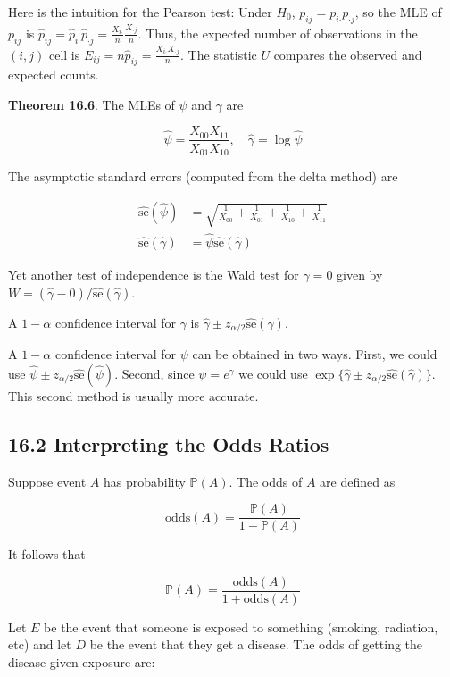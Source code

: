 Here is the intuition for the Pearson test: Under \(H_{0}\),
\(p_{ij} = p_{i\text{·}} p_{\text{·}j}\), so the MLE of \(p_{ij}\) is
\(\hat{p}_{ij} = \hat{p}_{i\text{·}} \hat{p}_{\text{·}j} = \frac{X_{i\text{·}}}{n} \frac{X_{\text{·}j}}{n}\).
Thus, the expected number of observations in the \((i, j)\) cell is
\(E_{ij} = n \hat{p}_{ij} = \frac{X_{i\text{·}} X_{\text{·}j}}{n}\). The
statistic \(U\) compares the observed and expected counts.

\textbf{Theorem 16.6}. The MLEs of \(\psi\) and \(\gamma\) are

\[
\hat{\psi} = \frac{X_{00} X_{11}}{X_{01} X_{10}}
, \quad
\hat{\gamma} = \log \hat{\psi}
\]

The asymptotic standard errors (computed from the delta method) are

\begin{align*}
\hat{\text{se}}(\hat{\psi}) &= \sqrt{\frac{1}{X_{00}} + \frac{1}{X_{01}} + \frac{1}{X_{10}} + \frac{1}{X_{11}}}\\
\hat{\text{se}}(\hat{\gamma}) &= \hat{\psi} \hat{\text{se}}(\hat{\gamma})
\end{align*}

Yet another test of independence is the Wald test for \(\gamma = 0\)
given by \(W = (\hat{\gamma} - 0) / \hat{\text{se}}(\hat{\gamma})\).

A \(1 - \alpha\) confidence interval for \(\gamma\) is
\(\hat{\gamma} \pm z_{\alpha/2} \hat{\text{se}}(\hat{\gamma})\).

A \(1 - \alpha\) confidence interval for \(\psi\) can be obtained in two
ways. First, we could use
\(\hat{\psi} \pm z_{\alpha/2} \hat{\text{se}}(\hat{\psi})\). Second,
since \(\psi = e^{\gamma}\) we could use
\(\exp \{\hat{\gamma} \pm z_{\alpha/2} \hat{\text{se}}(\hat{\gamma})\}\).
This second method is usually more accurate.

\subsection*{16.2 Interpreting the Odds
Ratios}\label{interpreting-the-odds-ratios}

Suppose event \(A\) has probability \(\mathbb{P}(A)\). The odds of \(A\)
are defined as

\[\text{odds}(A) = \frac{\mathbb{P}(A)}{1 - \mathbb{P}(A)}\]

It follows that

\[\mathbb{P}(A) = \frac{\text{odds}(A)}{1 + \text{odds}(A)}\]

Let \(E\) be the event that someone is exposed to something (smoking,
radiation, etc) and let \(D\) be the event that they get a disease. The
odds of getting the disease given exposure are:

